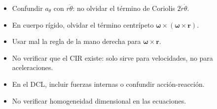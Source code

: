 \documentclass[12pt,a4paper]{article}
\begin{document}
\vspace{0.5cm}

\begin{warnbox}
\begin{itemize}
    \item Confundir $a_\theta$ con $r\ddot{\theta}$: no olvidar el término de Coriolis $2\dot{r}\dot{\theta}$.
    \item En cuerpo rígido, olvidar el término centrípeto $\boldsymbol{\omega}\times(\boldsymbol{\omega}\times\mathbf{r})$.
    \item Usar mal la regla de la mano derecha para $\boldsymbol{\omega}\times\mathbf{r}$.
    \item No verificar que el CIR existe: solo sirve para velocidades, no para aceleraciones.
    \item En el DCL, incluir fuerzas internas o confundir acción-reacción.
    \item No verificar homogeneidad dimensional en las ecuaciones.
\end{itemize}
\end{warnbox}
\end{document}
